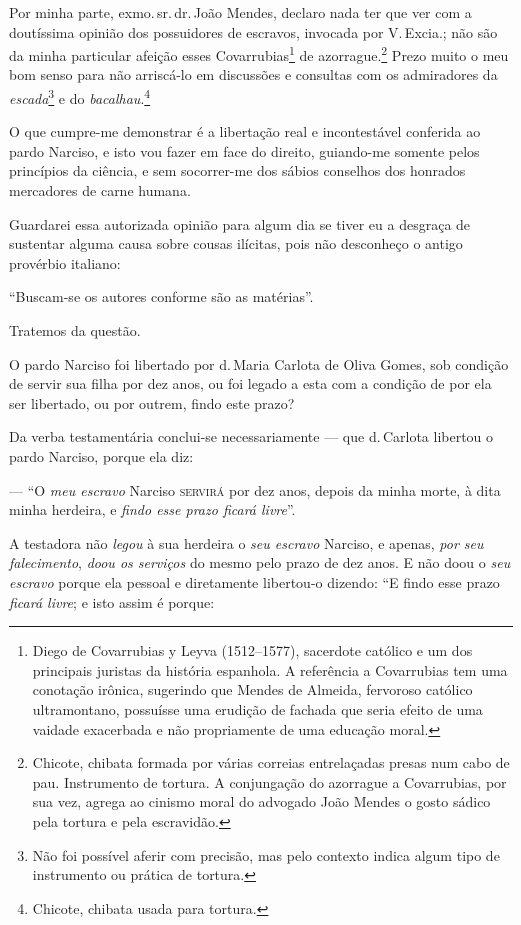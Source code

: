 Por minha parte, exmo.\,sr.\,dr.\,João Mendes, declaro nada ter que ver com
a doutíssima opinião dos possuidores de escravos, invocada por V.\,Excia.; não são da minha particular afeição esses Covarrubias\footnote{
  Diego de Covarrubias y Leyva (1512--1577), sacerdote católico e um dos
  principais juristas da história espanhola. A referência a Covarrubias
  tem uma conotação irônica, sugerindo que Mendes de Almeida, fervoroso
  católico ultramontano, possuísse uma erudição de fachada que seria
  efeito de uma vaidade exacerbada e não propriamente de uma educação
  moral.} de azorrague.\footnote{ Chicote,
  chibata formada por várias correias entrelaçadas presas num cabo de
  pau. Instrumento de tortura. A conjungação do azorrague a Covarrubias,
  por sua vez, agrega ao cinismo moral do advogado João Mendes o gosto
  sádico pela tortura e pela escravidão.} Prezo muito o meu bom senso
para não arriscá-lo em discussões e consultas com os admiradores da
\emph{escada}\footnote{ Não foi possível aferir com precisão, mas
  pelo contexto indica algum tipo de instrumento ou prática de tortura.}
e do \emph{bacalhau}.\footnote{ Chicote, chibata usada para tortura.}

O que cumpre-me demonstrar é a libertação real e incontestável conferida
ao pardo Narciso, e isto vou fazer em face do direito, guiando-me
somente pelos princípios da ciência, e sem socorrer-me dos sábios
conselhos dos honrados mercadores de carne humana.

Guardarei essa autorizada opinião para algum dia se tiver eu a desgraça
de sustentar alguma causa sobre cousas ilícitas, pois não desconheço o
antigo provérbio italiano:

``Buscam-se os autores conforme são as matérias''.

Tratemos da questão.

O pardo Narciso foi libertado por d.\,Maria Carlota de Oliva Gomes, sob
condição de servir sua filha por dez anos, ou foi legado a esta com a
condição de por ela ser libertado, ou por outrem, findo este prazo?

Da verba testamentária conclui-se necessariamente --- que d.\,Carlota
libertou o pardo Narciso, porque ela diz:

--- ``O \emph{meu escravo} Narciso \textsc{servirá} por dez anos, depois da minha
morte, à dita minha herdeira, e \emph{findo esse prazo ficará livre}''.

A testadora não \emph{legou} à sua herdeira o \emph{seu escravo}
Narciso, e apenas, \emph{por seu falecimento}, \emph{doou os serviços}
do mesmo pelo prazo de dez anos. E não doou o \emph{seu escravo} porque
ela pessoal e diretamente libertou-o dizendo: ``E findo esse prazo
\emph{ficará livre}; e isto assim é porque:

